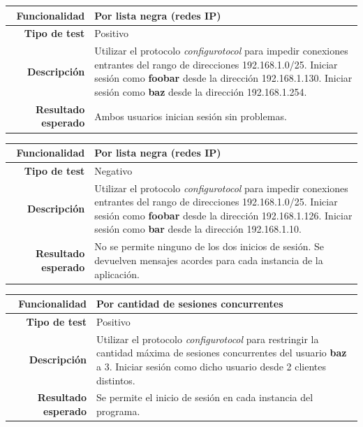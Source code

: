 \documentclass[a4paper,10pt]{article}
\begin{document}
\begin{center}
  \begin{tabular}{|r|p{12.5cm}|}
    \hline
    \textbf{Funcionalidad}	&	Por lista negra (redes IP)\\
    \hline
    \textbf{Tipo de test}	&	Positivo\\
    \hline
    \textbf{Descripción}	&	Utilizar el protocolo \textit{configurotocol} para impedir conexiones
					entrantes del rango de direcciones 192.168.1.0/25. Iniciar sesión como
					\textbf{foobar} desde la dirección 192.168.1.130. Iniciar sesión como
					\textbf{baz} desde la dirección 192.168.1.254.\\
    \hline
    \textbf{Resultado esperado}	&	Ambos usuarios inician sesión sin problemas.\\
    \hline   
  \end{tabular}
\end{center}

\begin{center}
  \begin{tabular}{|r|p{12.5cm}|}
    \hline
    \textbf{Funcionalidad}	&	Por lista negra (redes IP)\\
    \hline
    \textbf{Tipo de test}	&	Negativo\\
    \hline
    \textbf{Descripción}	&	Utilizar el protocolo \textit{configurotocol} para impedir conexiones
					entrantes del rango de direcciones 192.168.1.0/25. Iniciar sesión como
					\textbf{foobar} desde la dirección 192.168.1.126. Iniciar sesión como
					\textbf{bar} desde la dirección 192.168.1.10.\\
    \hline
    \textbf{Resultado esperado}	&	No se permite ninguno de los dos inicios de sesión. Se devuelven mensajes
					acordes para cada instancia de la aplicación.\\
    \hline   
  \end{tabular}
\end{center}

\begin{center}
  \begin{tabular}{|r|p{12.5cm}|}
    \hline
    \textbf{Funcionalidad}	&	Por cantidad de sesiones concurrentes\\
    \hline
    \textbf{Tipo de test}	&	Positivo\\
    \hline
    \textbf{Descripción}	&	Utilizar el protocolo \textit{configurotocol} para restringir la cantidad
					máxima de sesiones concurrentes del usuario \textbf{baz} a 3.
					Iniciar sesión como dicho usuario desde 2 clientes distintos.\\
    \hline
    \textbf{Resultado esperado}	&	Se permite el inicio de sesión en cada instancia del programa.\\
    \hline   
  \end{tabular}
\end{center}
\end{document}
